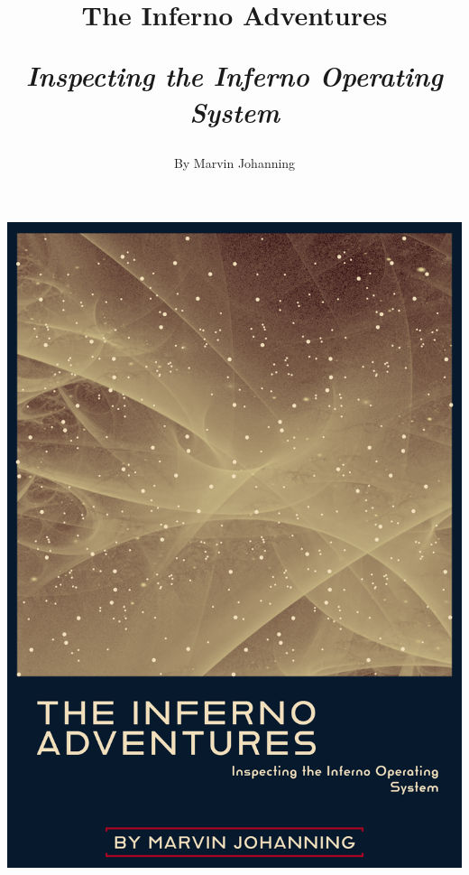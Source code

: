 \documentclass[a5paper,twoside,12pt]{report}
\begin{document}

\thispagestyle{empty}
\begin{center}
  \includegraphics[scale=0.162]{cover-ideas/cover7.png}
\end{center}
\newpage

\thispagestyle{empty}
  \mbox{}
  \newpage

\title{%
  The Inferno Adventures\\
  \begin{center}
    \textit{Inspecting the Inferno Operating System}
  \end{center}
}
\author{By Marvin Johanning}
\date{}
\maketitle
\end{document}
